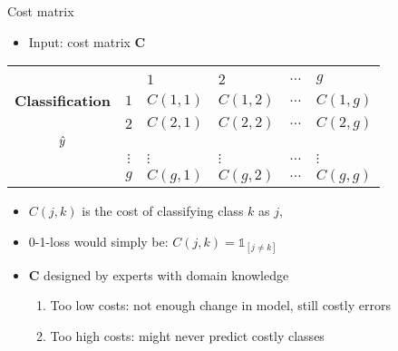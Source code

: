 \documentclass[11pt,compress,t,notes=noshow, xcolor=table]{beamer}
\begin{document}
\begin{vbframe}{Cost matrix}
%	
%	
	\begin{itemize}
%		
		\item Input: cost matrix $\mathbf{C}$ 
	\end{itemize}
	\begin{center}
		\tiny
		\begin{tabular}{cc|>{\centering\arraybackslash}p{8em}>{\centering\arraybackslash}p{8em}>{\centering\arraybackslash}p{5em}>{\centering\arraybackslash}p{8em}}
			& & \multicolumn{4}{c}{\bfseries True Class $y$} \\
			&  & $1$ & $2$ & $\ldots$ & $g$  \\
			\hline
			\bfseries Classification     & $1$ & $C(1,1)$  &  $C(1,2)$  & $\ldots$ &  $C(1,g)$ \\
			& $2$ &  $C(2,1)$  &  $C(2,2)$  & $\ldots$ & $C(2,g)$  \\
            $\hat{y}$ & & & & & \\
			& $\vdots$ & $\vdots$ & $\vdots$ & $\ldots$ & $\vdots$ \\
			& $g$ & $C(g,1)$ & $C(g,2)$  & $\ldots$ &  $C(g,g)$\\
		\end{tabular}
	\end{center}
	\begin{itemize}
		\item $C(j,k)$ is the cost of classifying class $k$ as $j,$ 
  \item 0-1-loss would simply be: $C(j,k) = \mathds{1}_{[ j \neq k ]}$
		
		\item $\mathbf{C}$ designed by experts with domain knowledge
		\begin{enumerate}
            \item Too low costs: not enough change in model, still costly errors
            \item Too high costs: might never predict costly classes
		\end{enumerate}
		
	\end{itemize}


\end{vbframe}
\end{document}

